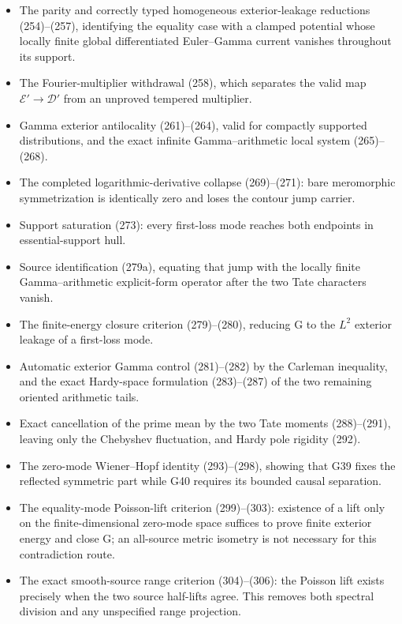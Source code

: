 \documentclass[11pt]{article}
\begin{document}
\begin{itemize}
\item The parity and correctly typed homogeneous exterior-leakage reductions
      (254)--(257), identifying the equality case with a clamped potential
      whose locally finite global differentiated Euler--Gamma current
      vanishes throughout its support.
\item The Fourier-multiplier withdrawal (258), which separates the valid
      map $\mathcal E'\to\mathcal D'$ from an unproved tempered multiplier.
\item Gamma exterior antilocality (261)--(264), valid for compactly supported
      distributions, and the exact infinite Gamma--arithmetic local system
      (265)--(268).
\item The completed logarithmic-derivative collapse (269)--(271): bare
      meromorphic symmetrization is identically zero and loses the contour
      jump carrier.
\item Support saturation (273): every first-loss mode reaches both endpoints
      in essential-support hull.
\item Source identification (279a), equating that jump with the locally
      finite Gamma--arithmetic explicit-form operator after the two Tate
      characters vanish.
\item The finite-energy closure criterion (279)--(280), reducing G to the
      $L^2$ exterior leakage of a first-loss mode.
\item Automatic exterior Gamma control (281)--(282) by the Carleman
      inequality, and the exact Hardy-space formulation (283)--(287) of the
      two remaining oriented arithmetic tails.
\item Exact cancellation of the prime mean by the two Tate moments
      (288)--(291), leaving only the Chebyshev fluctuation, and Hardy pole
      rigidity (292).
\item The zero-mode Wiener--Hopf identity (293)--(298), showing that G39
      fixes the reflected symmetric part while G40 requires its bounded
      causal separation.
\item The equality-mode Poisson-lift criterion (299)--(303): existence of a
      lift only on the finite-dimensional zero-mode space suffices to prove
      finite exterior energy and close G; an all-source metric isometry is
      not necessary for this contradiction route.
\item The exact smooth-source range criterion (304)--(306): the Poisson lift
      exists precisely when the two source half-lifts agree.  This removes
      both spectral division and any unspecified range projection.

\end{itemize}
\end{document}
